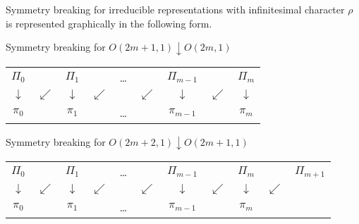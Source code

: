 \begin{theorem}
\label{thm:introSBOfg}
Symmetry breaking for  irreducible representations with infinitesimal character $\rho$  is represented graphically in the following form.  

{Symmetry breaking for $O(2m+1,1)\downarrow O(2m,1)$ }


\begin{center}
\begin{tabular}{c@{~}c@{~}c@{~}c@{~}c@{~}c@{~}c@{~}c@{~}c}
$\Pi_0$& &$\Pi_1$& &\dots & & $\Pi_{m-1} $& & $\Pi_{m}$ 
\\
$\downarrow$ &$\swarrow$& $\downarrow $& $\swarrow$ & &$\swarrow$ & $ \downarrow $&  $\swarrow $  &  $\downarrow$ 
\\
$\pi_0$& &$\pi_1$& &\dots & & $\pi_{m-1}$ & & $\pi_{m}$ 
\end{tabular}
\end{center}
\label{fig:introHasse1}


\bigskip


{Symmetry breaking for $O(2m+2,1) \downarrow O(2m+1,1)$ }
\begin{center}
\begin{tabular}{@{}c@{~}c@{~}c@{~}c@{~}c@{~}c@{~}c@{~}c@{~}c@{~}c@{~}c@{}}
$\Pi_0$& &$\Pi_1$& &\dots & & $\Pi_{m-1} $& & $\Pi_{m}$ & & $\Pi_{m+1}$
\\
$\downarrow$ & $\swarrow$ & $\downarrow $ & $\swarrow$ & & $\swarrow$ & $ \downarrow $& $\swarrow $ & $\downarrow$ & $\swarrow$ & \\
$\pi_0$& &$\pi_1$& &\dots & & $\pi_{m-1}$ & & $\pi_{m}$ 
\end{tabular}
\end{center}
\label{fig:introHasse2}
\end{theorem}



